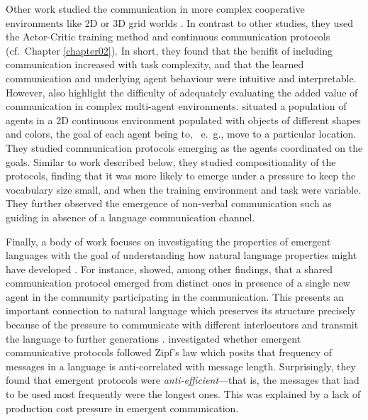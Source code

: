 Other work studied the communication in more complex cooperative environments like 2D or 3D grid worlds \parencite{das2019tarmac}. In contrast to other studies, they used the Actor-Critic training method and continuous communication protocols (cf.~Chapter \ref{chapter02}). In short, they found that the benifit of including communication increased with task complexity, and that the learned communication and underlying agent behaviour were intuitive and interpretable. However, \cite{lowe2019pitfalls} also highlight the difficulty of adequately evaluating the added value of communication in complex multi-agent environments. \cite{mordatch2018emergence} situated a population of agents in a 2D continuous environment populated with objects of different shapes and colors, the goal of each agent being to, ~e.~g., move to a particular location. They studied communication protocols emerging as the agents coordinated on the goals. Similar to work described below, they studied compositionality of the protocols, finding that it was more likely to emerge under a pressure to keep the vocabulary size small, and when the training environment and task were variable. They further observed the emergence of non-verbal communication such as guiding in absence of a language communication channel.

Finally, a body of work focuses on investigating the properties of emergent languages with the goal of understanding how natural language properties might have developed \parencite{lazaridou2020emergent}. For instance, \cite{graesser2019emergent} showed, among other findings, that a shared communication protocol emerged from distinct ones in presence of a single new agent in the community participating in the communication. This presents an important connection to natural language which preserves its structure precisely because of the pressure to communicate with different interlocutors and transmit the language to further generations \parencite{tomasello2010origins, kirby2014iterated}. \cite{chaabouni2019anti} investigated whether emergent communicative protocols followed Zipf's law which posits that frequency of messages in a language is anti-correlated with message length. Surprisingly, they found that emergent protocols were \textit{anti-efficient}---that is, the messages that had to be used most frequently were the longest ones. This was explained by a lack of production cost pressure in emergent communication.

